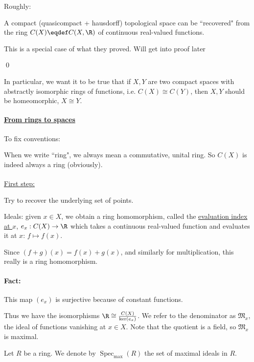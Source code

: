 \documentclass[x11names,reqno,14pt]{extarticle}
\newcommand{\Specmax}{\operatorname{Spec}_{\operatorname{max}}}
\begin{document}

Roughly: 

A compact (quasicompact + hausdorff) topological space can be ``recovered" from the ring $C(X) \eqdef C(X,\R)$ of continuous real-valued functions.

\proof

This is a special case of what they proved. Will get into proof later

\qed

In particular, we want it to be true that if $X, Y$ are two compact spaces with abstractly isomorphic rings of functions, i.e. $C(X) \cong C(Y)$, then $X, Y$ should be homeomorphic, $X \cong Y$. 

\paragraph{\underline{From rings to spaces}}

To fix conventions: 


When we write ``ring", we always mean a commutative, unital ring. So $C(X)$ is indeed always a ring (obviously). 
\paragraph{}

\underline{First step:}

Try to recover the underlying set of points. 

Ideals: given $x \in X$, we obtain a ring homomorphism, called the \underline{evaluation index at $x$}, $e_x:C(X)\to \R$ which takes a continuous real-valued function and evaluates it at $x$: $f\mapsto f(x)$. 

Since $(f+g)(x) = f(x) + g(x)$, and similarly for multiplication, this really is a ring homomorphism. 

\paragraph{Fact:} This map $(e_x)$ is surjective because of constant functions. 

Thus we have the isomorphisms $\R \cong \frac{C(X)}{\ker(e_x)}$. We refer to the denominator as $\mathfrak{M}_x$, the ideal of functions vanishing at $x \in X$. Note that the quotient is a field, so $\mathfrak{M}_x$ is maximal. 


Let $R$ be a ring. We denote by $\Specmax(R)$ the set of maximal ideals in $R$. 
\end{document}
